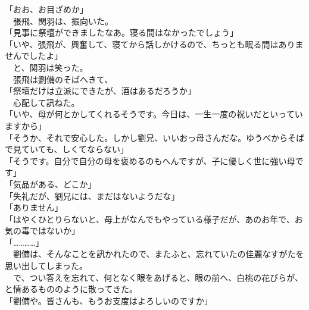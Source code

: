 \documentclass[
  paper=a5,
  fontsize=10pt,
  jafontsize=9.5pt,
  tate,                  %
  open_bracket_pos=nibu, %
]{jlreq}
\begin{document}
「おお、お目ざめか」\\


　張飛、関羽は、振向いた。\\


「見事に祭壇ができましたなあ。寝る間はなかったでしょう」\\


「いや、張飛が、興奮して、寝てから話しかけるので、ちっとも眠る間はありませんでしたよ」\\


　と、関羽は笑った。\\


　張飛は劉備のそばへきて、\\


「祭壇だけは立派にできたが、酒はあるだろうか」\\


　心配して訊ねた。\\


「いや、母が何とかしてくれるそうです。今日は、一生一度の祝いだといっていますから」\\


「そうか、それで安心した。しかし劉兄、いいおっ母さんだな。ゆうべからそばで見ていても、しくてならない」\\


「そうです。自分で自分の母を褒めるのもへんですが、子に優しく世に強い母です」\\


「気品がある、どこか」\\


「失礼だが、劉兄には、まだはないようだな」\\


「ありません」\\


「はやくひとりらないと、母上がなんでもやっている様子だが、あのお年で、お気の毒ではないか」\\


「…………」\\


　劉備は、そんなことを訊かれたので、またふと、忘れていたの佳麗なすがたを思い出してしまった。\\


　で、つい答えを忘れて、何となく眼をあげると、眼の前へ、白桃の花びらが、と情あるもののように散ってきた。\\


「劉備や。皆さんも、もうお支度はよろしいのですか」\\
\end{document}
